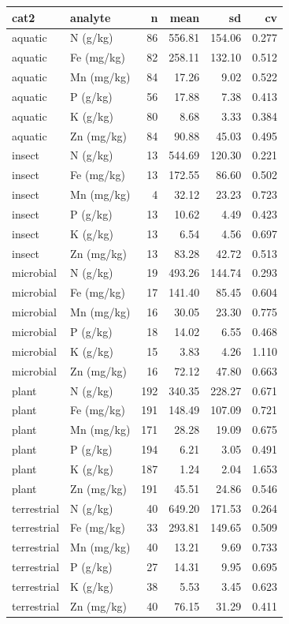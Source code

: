 \documentclass[
]{article}
\begin{document}
\begin{longtable}[]{@{}llrrrr@{}}
\toprule\noalign{}
cat2 & analyte & n & mean & sd & cv \\
\midrule\noalign{}
\endhead
\bottomrule\noalign{}
\endlastfoot
aquatic & N (g/kg) & 86 & 556.81 & 154.06 & 0.277 \\
aquatic & Fe (mg/kg) & 82 & 258.11 & 132.10 & 0.512 \\
aquatic & Mn (mg/kg) & 84 & 17.26 & 9.02 & 0.522 \\
aquatic & P (g/kg) & 56 & 17.88 & 7.38 & 0.413 \\
aquatic & K (g/kg) & 80 & 8.68 & 3.33 & 0.384 \\
aquatic & Zn (mg/kg) & 84 & 90.88 & 45.03 & 0.495 \\
insect & N (g/kg) & 13 & 544.69 & 120.30 & 0.221 \\
insect & Fe (mg/kg) & 13 & 172.55 & 86.60 & 0.502 \\
insect & Mn (mg/kg) & 4 & 32.12 & 23.23 & 0.723 \\
insect & P (g/kg) & 13 & 10.62 & 4.49 & 0.423 \\
insect & K (g/kg) & 13 & 6.54 & 4.56 & 0.697 \\
insect & Zn (mg/kg) & 13 & 83.28 & 42.72 & 0.513 \\
microbial & N (g/kg) & 19 & 493.26 & 144.74 & 0.293 \\
microbial & Fe (mg/kg) & 17 & 141.40 & 85.45 & 0.604 \\
microbial & Mn (mg/kg) & 16 & 30.05 & 23.30 & 0.775 \\
microbial & P (g/kg) & 18 & 14.02 & 6.55 & 0.468 \\
microbial & K (g/kg) & 15 & 3.83 & 4.26 & 1.110 \\
microbial & Zn (mg/kg) & 16 & 72.12 & 47.80 & 0.663 \\
plant & N (g/kg) & 192 & 340.35 & 228.27 & 0.671 \\
plant & Fe (mg/kg) & 191 & 148.49 & 107.09 & 0.721 \\
plant & Mn (mg/kg) & 171 & 28.28 & 19.09 & 0.675 \\
plant & P (g/kg) & 194 & 6.21 & 3.05 & 0.491 \\
plant & K (g/kg) & 187 & 1.24 & 2.04 & 1.653 \\
plant & Zn (mg/kg) & 191 & 45.51 & 24.86 & 0.546 \\
terrestrial & N (g/kg) & 40 & 649.20 & 171.53 & 0.264 \\
terrestrial & Fe (mg/kg) & 33 & 293.81 & 149.65 & 0.509 \\
terrestrial & Mn (mg/kg) & 40 & 13.21 & 9.69 & 0.733 \\
terrestrial & P (g/kg) & 27 & 14.31 & 9.95 & 0.695 \\
terrestrial & K (g/kg) & 38 & 5.53 & 3.45 & 0.623 \\
terrestrial & Zn (mg/kg) & 40 & 76.15 & 31.29 & 0.411 \\
\end{longtable}
\end{document}
